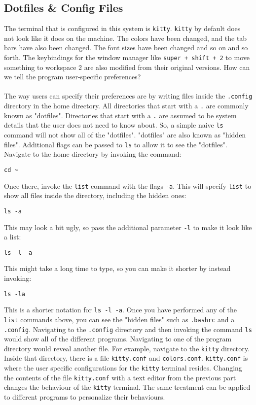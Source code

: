 \documentclass[a4paper, 12pt]{report}
\begin{document}
\begin{center}
\subsection{Dotfiles \& Config Files}
\begin{comment}
\end{comment}
The terminal that is configured in this system is \texttt{kitty}. \texttt{kitty} by default does not look like it does on the machine. The colors have been changed, and the tab bars have also been changed. The font sizes have been changed and so on and so forth. The keybindings for the window manager like \texttt{super + shift + 2} to move something to workspace 2 are also modified from their original versions. How can we tell the program user-specific preferences? 
\\~\\The way users can specify their preferences are by writing files inside the \texttt{.config} directory in the home directory. All directories that start with a \texttt{.} are commonly known as "dotfiles". Directories that start with a \texttt{.} are assumed to be system details that the user does not need to know about. So, a simple naive \texttt{ls} command will not show all of the "dotfiles". "dotfiles" are also known as "hidden files". Additional flags can be passed to \texttt{ls} to allow it to see the "dotfiles". Navigate to the home directory by invoking the command:
\begin{lstlisting}
cd ~
\end{lstlisting}
Once there, invoke the \texttt{list} command with the flags \texttt{-a}. This will specify \texttt{list} to show all files inside the directory, including the hidden ones:
\begin{lstlisting}
ls -a
\end{lstlisting}
This may look a bit ugly, so pass the additional parameter \texttt{-l} to make it look like a list:
\begin{lstlisting}
ls -l -a
\end{lstlisting}    
This might take a long time to type, so you can make it shorter by instead invoking:
\begin{lstlisting}
ls -la
\end{lstlisting}
This is a shorter notation for \texttt{ls -l -a}. Once you have performed any of the \texttt{list} commands above, you can see the "hidden files" such as \texttt{.bashrc} and a \texttt{.config}. Navigating to the \texttt{.config} directory and then invoking the command \texttt{ls} would show all of the different programs. Navigating to one of the program directory would reveal another file. For example, navigate to the \texttt{kitty} directory. Inside that directory, there is a file \texttt{kitty.conf} and \texttt{colors.conf}. \texttt{kitty.conf} is where the user specific configurations for the \texttt{kitty} terminal resides. Changing the contents of the file \texttt{kitty.conf} with a text editor from the previous part changes the behaviour of the \texttt{kitty} terminal. The same treatment can be applied to different programs to personalize their behaviours. 

\end{center}
\end{document}
